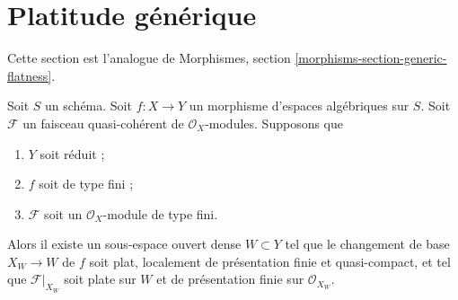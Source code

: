 \section{Platitude générique}
\label{section-generic-flatness}

\noindent
Cette section est l'analogue de
Morphismes, section \ref{morphisms-section-generic-flatness}.

\begin{proposition}
\label{proposition-generic-flatness-reduced}
Soit $S$ un schéma.
Soit $f : X \to Y$ un morphisme d'espaces algébriques sur $S$.
Soit $\mathcal{F}$ un faisceau quasi-cohérent de $\mathcal{O}_X$-modules.
Supposons que
\begin{enumerate}
\item $Y$ soit réduit ;
\item $f$ soit de type fini ;
\item $\mathcal{F}$ soit un $\mathcal{O}_X$-module de type fini.
\end{enumerate}
Alors il existe un sous-espace ouvert dense $W \subset Y$ tel que
le changement de base $X_W \to W$ de $f$ soit plat, localement de présentation finie et
quasi-compact, et tel que $\mathcal{F}|_{X_W}$ soit plate sur $W$ et de
présentation finie sur $\mathcal{O}_{X_W}$.
\end{proposition}

